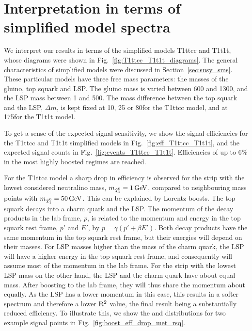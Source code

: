 \section{Interpretation in terms of simplified model spectra \label{sec:boost_interpretation}}

We interpret our results in terms of the simplified models T1ttcc and T1t1t, whose
diagrams were shown in Fig.~\ref{fig:T1ttcc_T1t1t_diagrams}. The general characteristics of
simplified models were discussed in Section~\ref{sec:susy_sms}. These particular models have three
free mass parameters: the masses of the gluino, top squark and LSP. The gluino mass is varied
between 600 and 1300\GeV, and the LSP mass between 1 and 500\GeV. The mass difference between the
top squark and the LSP, $\Delta m$, is kept fixed at 10, 25 or 80\GeV for the T1ttcc model, and at
175\GeV for the T1t1t model. 

To get a sense of the expected signal sensitivity, we show the signal efficiencies for the T1ttcc
and T1t1t simplified models in Fig.~\ref{fig:eff_T1ttcc_T1t1t}, and the expected signal counts in
Fig.~\ref{fig:events_T1ttcc_T1t1t}. 
Efficiencies of up to 6\% in the most highly boosted regimes are reached. 

For the T1ttcc model a sharp drop in efficiency is observed for the strip with the lowest considered
neutralino mass, $m_{\tilde{\chi}_1^0} = 1\,\text{Ge\hspace{-.08em}V}$, compared to neighbouring mass points with $m_{\tilde{\chi}_1^0} = 50\,\text{Ge\hspace{-.08em}V}$.
This can be explained by Lorentz boosts. The top squark decays into a charm quark and the LSP. The
momentum of the decay products in the lab frame, $p$, is related to the momentum and energy in the
top squark rest frame, $p'$ and $E'$, by $p = \gamma (p' + \beta E')$. Both decay products have the
same momentum in the top squark rest frame, but their energies will depend on their masses. 
For LSP masses higher than the mass of the charm quark, the LSP will have a higher energy
in the top squark rest frame, and consequently will assume most of the momentum in the lab frame.
For the strip with the lowest LSP mass on the other hand, the LSP and the charm quark have
about equal mass. After boosting to the lab frame, they will thus share the momentum about equally.
As the LSP has a lower momentum in this case, this results in a softer \ETm spectrum and therefore a
lower $\mathrm{R^2}$ value, the final result being a substantially reduced efficiency. To illustrate
this, we show the \ETm and \rsq distributions for two example signal points in
Fig.~\ref{fig:boost_eff_drop_met_rsq}.

